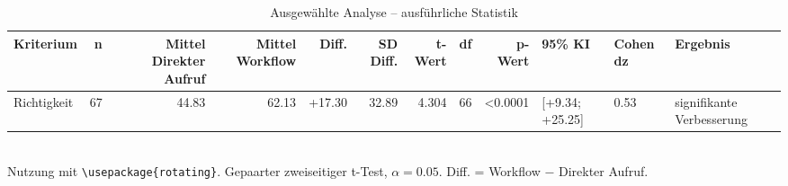 \begin{table}
\centering
\caption{Ausgewählte Analyse -- ausführliche Statistik}
\begin{tabular}{lrrrrrrrrlll}
\toprule
Kriterium & n & Mittel Direkter Aufruf & Mittel Workflow & Diff. & SD Diff. & t-Wert & df & p-Wert & 95\% KI & Cohen dz & Ergebnis \\
\midrule
Richtigkeit & 67 & 44.83 & 62.13 & +17.30 & 32.89 & 4.304 & 66 & <0.0001 & [+9.34; +25.25] & 0.53 & signifikante Verbesserung \\
\bottomrule
\end{tabular}
\\[2mm]
\footnotesize Nutzung mit \texttt{\textbackslash usepackage\{rotating\}}. Gepaarter zweiseitiger t-Test, $\alpha=0.05$. Diff. = Workflow $-$ Direkter Aufruf.
\end{table}
